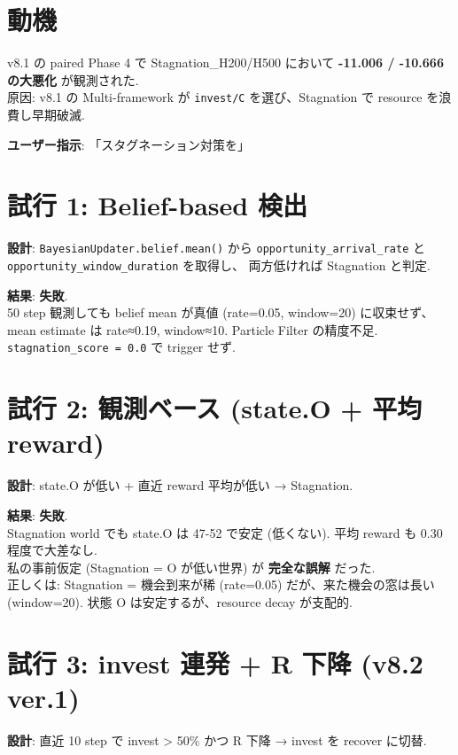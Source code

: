 \documentclass[a4paper,11pt]{report}
\begin{document}
\section{動機}

v8.1 の paired Phase 4 で Stagnation\_H200/H500 において
\textbf{-11.006 / -10.666 の大悪化} が観測された.\\
原因: v8.1 の Multi-framework が \texttt{invest/C} を選び、Stagnation で resource を浪費し早期破滅.

\textbf{ユーザー指示}: 「スタグネーション対策を」

\section{試行 1: Belief-based 検出}

\textbf{設計}: \texttt{BayesianUpdater.belief.mean()} から
\texttt{opportunity\_arrival\_rate} と \texttt{opportunity\_window\_duration} を取得し、
両方低ければ Stagnation と判定.

\textbf{結果}: \textbf{失敗}.\\
50 step 観測しても belief mean が真値 (rate=0.05, window=20) に収束せず、
mean estimate は rate≈0.19, window≈10. Particle Filter の精度不足.\\
\texttt{stagnation\_score = 0.0} で trigger せず.

\section{試行 2: 観測ベース (state.O + 平均 reward)}

\textbf{設計}: state.O が低い + 直近 reward 平均が低い → Stagnation.

\textbf{結果}: \textbf{失敗}.\\
Stagnation world でも state.O は 47-52 で安定 (低くない).
平均 reward も 0.30 程度で大差なし.\\
私の事前仮定 (Stagnation = O が低い世界) が \textbf{完全な誤解} だった.\\
正しくは: Stagnation = 機会到来が稀 (rate=0.05) だが、来た機会の窓は長い (window=20).
状態 O は安定するが、resource decay が支配的.

\section{試行 3: invest 連発 + R 下降 (v8.2 ver.1)}

\textbf{設計}: 直近 10 step で invest > 50\% かつ R 下降 → invest を recover に切替.
\end{document}
